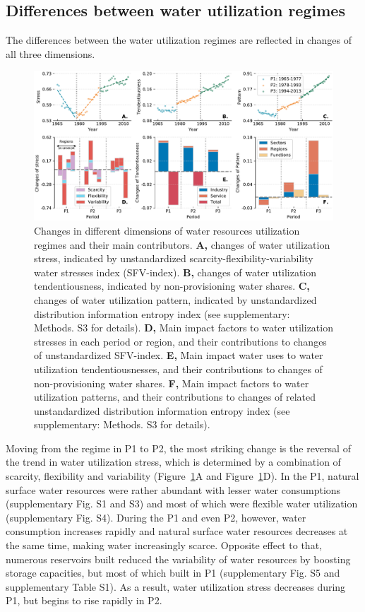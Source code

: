 \documentclass[9pt, twocolumn, twoside, lineno]{pnas-new}
\begin{document}
\subsection*{Differences between water utilization regimes}
The differences between the water utilization regimes are reflected in changes of all three dimensions.
\begin{figure}%
	\centering
	\includegraphics[width=\linewidth]{../../figures/main_text/dimensions.pdf}
	\caption{
		Changes in different dimensions of water resources utilization regimes and their main contributors.
		\textbf{A,} changes of water utilization stress, indicated by unstandardized scarcity-flexibility-variability water stresses index (SFV-index).
		\textbf{B,} changes of water utilization tendentiousness, indicated by non-provisioning water shares.
		\textbf{C,} changes of water utilization pattern, indicated by unstandardized distribution information entropy index (see supplementary: Methods. S3 for details).
		\textbf{D,} Main impact factors to water utilization stresses in each period or region, and their contributions to changes of unstandardized SFV-index.
		\textbf{E,} Main impact water uses to water utilization tendentiousnesses, and their contributions to changes of non-provisioning water shares.
		\textbf{F,} Main impact factors to water utilization patterns, and their contributions to changes of related unstandardized distribution information entropy index (see supplementary: Methods. S3 for details).
		}
	\label{fig:dimensions}
\end{figure}
Moving from the regime in P1 to P2, the most striking change is the reversal of the trend in water utilization stress, which is determined by a combination of scarcity, flexibility and variability (Figure~\ref{fig:dimensions}A and Figure~\ref{fig:dimensions}D).   
In the P1, natural surface water resources were rather abundant with lesser water consumptions (supplementary Fig. S1 and S3) and most of which were flexible water utilization (supplementary Fig. S4). During the P1 and even P2, however, water consumption increases rapidly and natural surface water resources decreases at the same time, making water increasingly scarce. Opposite effect to that, numerous reservoirs built reduced the variability of water resources by boosting storage capacities, but most of which built in P1 (supplementary Fig. S5 and supplementary Table S1). As a result, water utilization stress decreases during P1, but begins to rise rapidly in P2.
\end{document}

